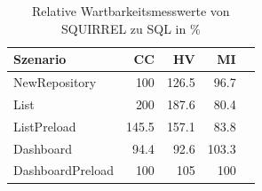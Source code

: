 \begin{table}[ht]
\centering
\caption{Relative Wartbarkeitsmesswerte von SQUIRREL zu SQL in \%}
\begin{tabular}{lrrrr}
\toprule
Szenario & CC & HV & MI \\
\midrule
	NewRepository &  100 & \cellcolor{red!21}  126.5 & \cellcolor{red!11}  96.7 \\
	List & \cellcolor{red!30}  200 & \cellcolor{red!30}  187.6 & \cellcolor{red!18}  80.4 \\
	ListPreload & \cellcolor{red!28}  145.5 & \cellcolor{red!30}  157.1 & \cellcolor{red!16}  83.8 \\
	Dashboard & \cellcolor{green!12}  94.4 & \cellcolor{green!13}  92.6 & \cellcolor{green!11}  103.3 \\
	DashboardPreload &  100 & \cellcolor{red!12}  105 &  100 \\
\bottomrule
\end{tabular}
\label{tab:wartbarkeit_relativ_squirrel}
\end{table}
	